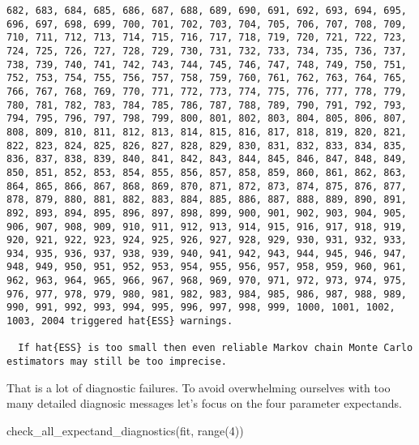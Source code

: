 \documentclass[
  letterpaper,
  DIV=11,
  numbers=noendperiod]{scrartcl}
\newenvironment{Shaded}{\begin{snugshade}}{\end{snugshade}}
\newcommand{\BuiltInTok}[1]{\textcolor[rgb]{0.00,0.23,0.31}{#1}}
\newcommand{\DecValTok}[1]{\textcolor[rgb]{0.68,0.00,0.00}{#1}}
\newcommand{\NormalTok}[1]{\textcolor[rgb]{0.00,0.23,0.31}{#1}}
\begin{document}
\begin{verbatim}
682, 683, 684, 685, 686, 687, 688, 689, 690, 691, 692, 693, 694, 695, 696, 697, 698, 699, 700, 701, 702, 703, 704, 705, 706, 707, 708, 709, 710, 711, 712, 713, 714, 715, 716, 717, 718, 719, 720, 721, 722, 723, 724, 725, 726, 727, 728, 729, 730, 731, 732, 733, 734, 735, 736, 737, 738, 739, 740, 741, 742, 743, 744, 745, 746, 747, 748, 749, 750, 751, 752, 753, 754, 755, 756, 757, 758, 759, 760, 761, 762, 763, 764, 765, 766, 767, 768, 769, 770, 771, 772, 773, 774, 775, 776, 777, 778, 779, 780, 781, 782, 783, 784, 785, 786, 787, 788, 789, 790, 791, 792, 793, 794, 795, 796, 797, 798, 799, 800, 801, 802, 803, 804, 805, 806, 807, 808, 809, 810, 811, 812, 813, 814, 815, 816, 817, 818, 819, 820, 821, 822, 823, 824, 825, 826, 827, 828, 829, 830, 831, 832, 833, 834, 835, 836, 837, 838, 839, 840, 841, 842, 843, 844, 845, 846, 847, 848, 849, 850, 851, 852, 853, 854, 855, 856, 857, 858, 859, 860, 861, 862, 863, 864, 865, 866, 867, 868, 869, 870, 871, 872, 873, 874, 875, 876, 877, 878, 879, 880, 881, 882, 883, 884, 885, 886, 887, 888, 889, 890, 891, 892, 893, 894, 895, 896, 897, 898, 899, 900, 901, 902, 903, 904, 905, 906, 907, 908, 909, 910, 911, 912, 913, 914, 915, 916, 917, 918, 919, 920, 921, 922, 923, 924, 925, 926, 927, 928, 929, 930, 931, 932, 933, 934, 935, 936, 937, 938, 939, 940, 941, 942, 943, 944, 945, 946, 947, 948, 949, 950, 951, 952, 953, 954, 955, 956, 957, 958, 959, 960, 961, 962, 963, 964, 965, 966, 967, 968, 969, 970, 971, 972, 973, 974, 975, 976, 977, 978, 979, 980, 981, 982, 983, 984, 985, 986, 987, 988, 989, 990, 991, 992, 993, 994, 995, 996, 997, 998, 999, 1000, 1001, 1002, 1003, 2004 triggered hat{ESS} warnings.

  If hat{ESS} is too small then even reliable Markov chain Monte Carlo estimators may still be too imprecise.

\end{verbatim}

That is a lot of diagnostic failures. To avoid overwhelming ourselves
with too many detailed diagnosic messages let's focus on the four
parameter expectands.

\begin{Shaded}
\begin{Highlighting}[]
\NormalTok{check\_all\_expectand\_diagnostics(fit, }\BuiltInTok{range}\NormalTok{(}\DecValTok{4}\NormalTok{))}
\end{Highlighting}
\end{Shaded}
\end{document}
